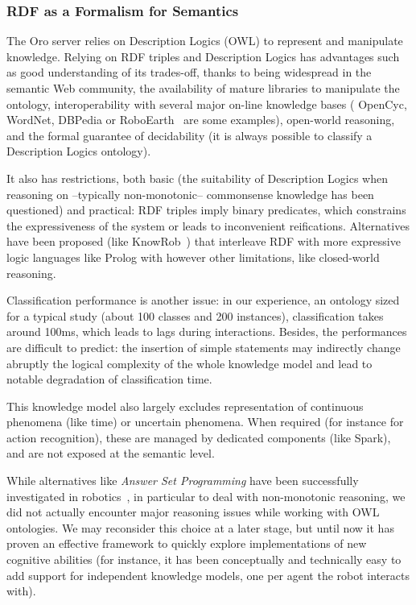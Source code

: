 \documentclass[preprint,3p,times]{elsarticle}
\begin{document}
\subsubsection{RDF as a Formalism for Semantics}

The {\sc Oro} server relies on Description Logics (OWL) to represent and
manipulate knowledge. Relying on RDF triples and Description Logics has advantages such as good
understanding of its trades-off, thanks to being widespread in the semantic Web
community, the availability of mature libraries to manipulate the ontology,
interoperability with several major on-line knowledge bases ({\sc
OpenCyc}, {\sc WordNet}, {\sc DBPedia} or {\sc RoboEarth}~\cite{Waibel2011} are
some examples), open-world reasoning, and the formal guarantee of decidability
(it is always possible to classify a Description Logics ontology).

It also has restrictions, both basic (the suitability of
Description Logics when reasoning on --typically non-monotonic-- commonsense
knowledge has been questioned) and practical: RDF triples imply binary
predicates, which constrains the expressiveness of the system or leads to
inconvenient reifications. Alternatives have been proposed (like {\sc
KnowRob}~\cite{Tenorth2009a}) that interleave RDF with more expressive logic languages
like {\sc Prolog} with however other limitations, like closed-world reasoning.

Classification performance is another issue: in our experience, an
ontology sized for a typical study (about 100 classes and 200 instances),
classification takes around 100ms, which leads to lags during
interactions.  Besides, the performances are difficult to predict: the insertion
of simple statements may indirectly change abruptly the logical
complexity of the whole knowledge model and lead to notable degradation of
classification time.

This knowledge model also largely excludes representation of continuous
phenomena (like time) or uncertain phenomena. When required (for instance for
action recognition), these are managed by dedicated components (like {\sc
Spark}), and are not exposed at the semantic level.

While alternatives like \emph{Answer Set Programming} have been successfully
investigated in robotics~\cite{Chen2010,Erdem2012}, in particular to deal with
non-monotonic reasoning, we did not actually encounter major reasoning issues
while working with OWL ontologies. We may reconsider this choice at a later
stage, but until now it has proven an effective framework to quickly explore
implementations of new cognitive abilities (for instance, it has been
conceptually and technically easy to add support for independent knowledge
models, one per agent the robot interacts with).
\end{document}
